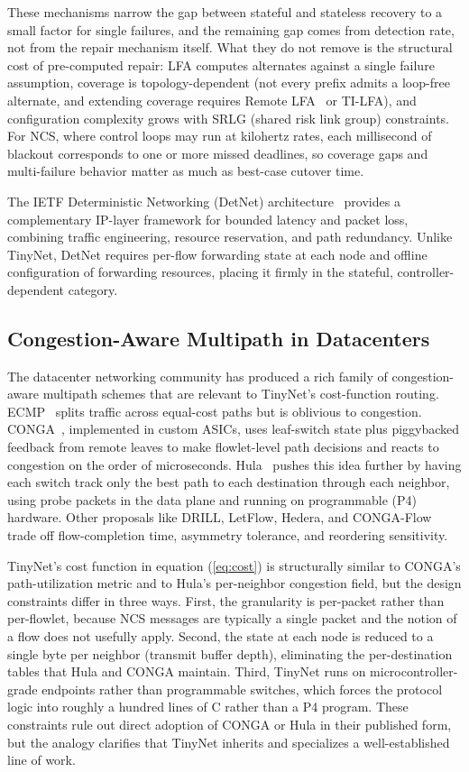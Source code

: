 These mechanisms narrow the gap between stateful and stateless recovery to a small factor for single failures, and the remaining gap comes from detection rate, not from the repair mechanism itself. What they do not remove is the structural cost of pre-computed repair: LFA computes alternates against a single failure assumption, coverage is topology-dependent (not every prefix admits a loop-free alternate, and extending coverage requires Remote LFA~\cite{rfc7490} or TI-LFA), and configuration complexity grows with SRLG (shared risk link group) constraints. For NCS, where control loops may run at kilohertz rates, each millisecond of blackout corresponds to one or more missed deadlines, so coverage gaps and multi-failure behavior matter as much as best-case cutover time.

The IETF Deterministic Networking (DetNet) architecture~\cite{rfc8655} provides a complementary IP-layer framework for bounded latency and packet loss, combining traffic engineering, resource reservation, and path redundancy. Unlike TinyNet, DetNet requires per-flow forwarding state at each node and offline configuration of forwarding resources, placing it firmly in the stateful, controller-dependent category.
 
\subsection{Congestion-Aware Multipath in Datacenters}
\label{sec:related:dcn}
 
The datacenter networking community has produced a rich family of congestion-aware multipath schemes that are relevant to TinyNet's cost-function routing. ECMP~\cite{ecmp_rfc} splits traffic across equal-cost paths but is oblivious to congestion. CONGA~\cite{conga_sigcomm}, implemented in custom ASICs, uses leaf-switch state plus piggybacked feedback from remote leaves to make flowlet-level path decisions and reacts to congestion on the order of microseconds. Hula~\cite{hula_sosr} pushes this idea further by having each switch track only the best path to each destination through each neighbor, using probe packets in the data plane and running on programmable (P4) hardware. Other proposals like DRILL, LetFlow, Hedera, and CONGA-Flow trade off flow-completion time, asymmetry tolerance, and reordering sensitivity.
 
TinyNet's cost function in equation (\ref{eq:cost}) is structurally similar to CONGA's path-utilization metric and to Hula's per-neighbor congestion field, but the design constraints differ in three ways. First, the granularity is per-packet rather than per-flowlet, because NCS messages are typically a single packet and the notion of a flow does not usefully apply. Second, the state at each node is reduced to a single byte per neighbor (transmit buffer depth), eliminating the per-destination tables that Hula and CONGA maintain. Third, TinyNet runs on microcontroller-grade endpoints rather than programmable switches, which forces the protocol logic into roughly a hundred lines of C rather than a P4 program. These constraints rule out direct adoption of CONGA or Hula in their published form, but the analogy clarifies that TinyNet inherits and specializes a well-established line of work.
 
